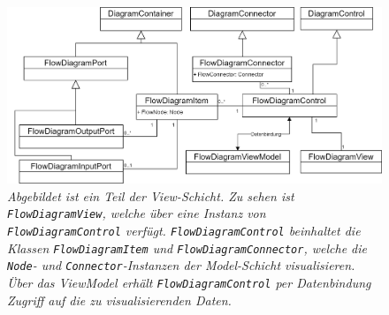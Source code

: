 \begin{figure} %
	\centering
		\includegraphics[width=\textwidth]{img/FlowViewUML.png}
	\caption[Klassenstruktur der View-Schicht]{\textit{Abgebildet ist ein Teil der View-Schicht. Zu sehen ist \texttt{FlowDiagramView}, welche über eine Instanz von \texttt{FlowDiagramControl} verfügt. \texttt{FlowDiagramControl} beinhaltet die Klassen \texttt{FlowDiagramItem} und \texttt{FlowDiagramConnector}, welche die \texttt{Node}- und \texttt{Connector}-Instanzen der Model-Schicht visualisieren. Über das ViewModel erhält \texttt{FlowDiagramControl} per Datenbindung Zugriff auf die zu visualisierenden Daten.}}
	\label{fig:UML:FlowView}
\end{figure}
